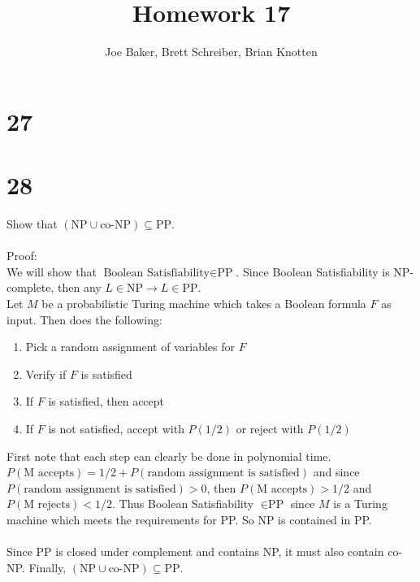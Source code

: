\documentclass[letterpaper,notitlepage,twoside]{article}
\begin{document}
\title{Homework 17}
\author{Joe Baker, Brett Schreiber, Brian Knotten}
\maketitle

\section*{27}

\section*{28}
Show that $\left(\text{NP}\cup\text{co-NP}\right)\subseteq\text{PP}$.
\\\\
Proof:
\\
We will show that $\text{Boolean Satisfiability}\in\text{PP}$. Since Boolean Satisfiability is NP-complete, then any $L \in \text{NP} \rightarrow L \in \text{PP}$.
\\
Let $M$ be a probabilistic Turing machine which takes a Boolean formula $F$ as input. Then does the following:
\begin{enumerate}
\item Pick a random assignment of variables for $F$
\item Verify if $F$ is satisfied
\item If $F$ is satisfied, then accept
\item If $F$ is not satisfied, accept with $P(1/2)$ or reject with $P(1/2)$
\end{enumerate}
First note that each step can clearly be done in polynomial time. $P(\text{M accepts}) = 1/2 + P(\text{random assignment is satisfied})$ and since $P(\text{random assignment is satisfied}) > 0$, then $P(\text{M accepts}) > 1/2$ and $P(\text{M rejects}) < 1/2$. Thus Boolean Satisfiability $\in \text{PP}$ since $M$ is a Turing machine which meets the requirements for PP. So NP is contained in PP.
\\\\
Since PP is closed under complement and contains NP, it must also contain co-NP. Finally, $\left(\text{NP}\cup\text{co-NP}\right)\subseteq\text{PP}$.
\end{document}
